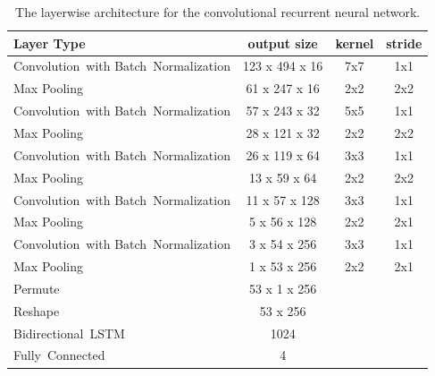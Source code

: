     
  \begin{table}[]
  \centering
  \begin{tabularx}{\textwidth}{Xccc}
  \toprule
Layer Type                                          & output size    & kernel & stride  \\ \midrule
\mbox{Convolution with} \mbox{Batch Normalization}  & 123 x 494 x 16  & 7x7    & 1x1     \\ 
Max Pooling                                         & 61 x 247 x 16   & 2x2    & 2x2     \\ 
\mbox{Convolution with} \mbox{Batch Normalization}  & 57 x 243 x 32   & 5x5    & 1x1     \\ 
Max Pooling                                         & 28 x 121 x 32   & 2x2    & 2x2     \\ 
\mbox{Convolution with} \mbox{Batch Normalization}  & 26 x 119 x 64   & 3x3    & 1x1     \\ 
Max Pooling                                         & 13 x 59 x 64    & 2x2    & 2x2     \\ 
\mbox{Convolution with} \mbox{Batch Normalization}  & 11 x 57 x 128   & 3x3    & 1x1     \\ 
Max Pooling                                         & 5 x 56 x 128    & 2x2    & 2x1     \\ 
\mbox{Convolution with} \mbox{Batch Normalization}  & 3 x 54 x 256    & 3x3    & 1x1     \\ 
Max Pooling                                         & 1 x 53 x 256    & 2x2    & 2x1     \\ 
Permute                                             & 53 x 1 x 256    &        &         \\
Reshape                                             & 53 x 256        &        &         \\
\mbox{Bidirectional LSTM}                           & 1024            &        &         \\
\mbox{Fully Connected}                              & 4               &        &         \\
  \bottomrule
  \end{tabularx}
  \caption{The layerwise architecture for the convolutional recurrent neural network.}
  \label{tab:layers_CRNN}
  \end{table}
  
  
